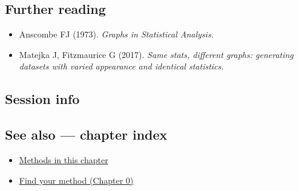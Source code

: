 \documentclass[
]{article}
\newenvironment{Shaded}{\begin{snugshade}}{\end{snugshade}}
\providecommand{\tightlist}{%
  \setlength{\itemsep}{0pt}\setlength{\parskip}{0pt}}
\begin{document}
\subsection{Further reading}\label{further-reading}

\begin{itemize}
\tightlist
\item
  Anscombe FJ (1973). \emph{Graphs in Statistical Analysis}.
\item
  Matejka J, Fitzmaurice G (2017). \emph{Same stats, different graphs:
  generating datasets with varied appearance and identical statistics}.
\end{itemize}

\subsection{Session info}\label{session-info}

\begin{Shaded}
\begin{Highlighting}[]

\end{Highlighting}
\end{Shaded}

\subsection{See also --- chapter index}\label{see-also-chapter-index}

\begin{itemize}
\tightlist
\item
  \href{../index.Rmd}{Methods in this chapter}
\item
  \href{../../../ch00-find-your-method.Rmd}{Find your method (Chapter
  0)}
\end{itemize}
\end{document}
